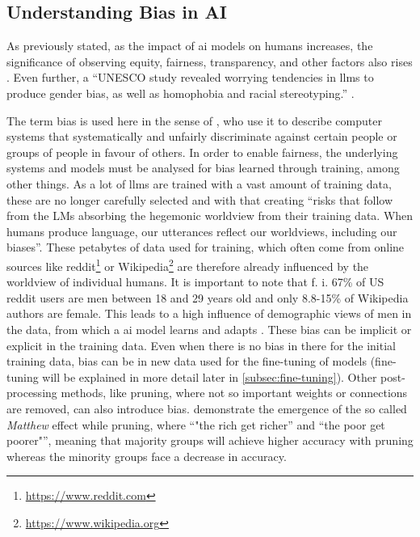 \subsection{Understanding Bias in AI}
\label{subsec:understandingbias}
As previously stated, as the impact of \acrshort{ai} models on humans increases, the significance of observing equity, fairness, transparency, and other factors also rises \citep{joblin}. Even further, a \enquote{UNESCO study revealed worrying tendencies in \acrfull{llms} to produce gender bias, as well as homophobia and racial stereotyping.} \citep{unesco-study}. 
\par 
The term bias is used here in the sense of \citet{friedman}, who use it to describe computer systems that systematically and unfairly discriminate against certain people or groups of people in favour of others.
In order to enable fairness, the underlying systems and models must be analysed for bias learned through training, among other things. As a lot of \acrshort{llms} are trained with a vast amount of training data, these are no longer carefully selected and with that creating \enquote{risks that follow from the LMs absorbing the hegemonic worldview from their training data. When humans produce language, our utterances reflect our worldviews, including our biases}. These petabytes of data used for training, which often come from online sources like reddit\footnote{\url{https://www.reddit.com}} or Wikipedia\footnote{\url{https://www.wikipedia.org}} are therefore already influenced by the worldview of individual humans. It is important to note that f. i. 67\% of US reddit users are men between 18 and 29 years old and only 8.8-15\% of Wikipedia authors are female. This leads to a high influence of demographic views of men in the data, from which a \acrshort{ai} model learns and adapts \citep{stochasticparrots}. These bias can be implicit or explicit in the training data. Even when there is no bias in there for the initial training data, bias can be in new data used for the fine-tuning of models (fine-tuning will be explained in more detail later in \autoref{subsec:fine-tuning}). Other post-processing methods, like pruning, where not so important weights or connections are removed, can also introduce bias. \citet{tran2022pruning} demonstrate the emergence of the so called \textit{Matthew} effect while pruning, where \enquote{"the rich get richer” and “the poor get poorer"}, meaning that majority groups will achieve higher accuracy with pruning whereas the minority groups face a decrease in accuracy.

